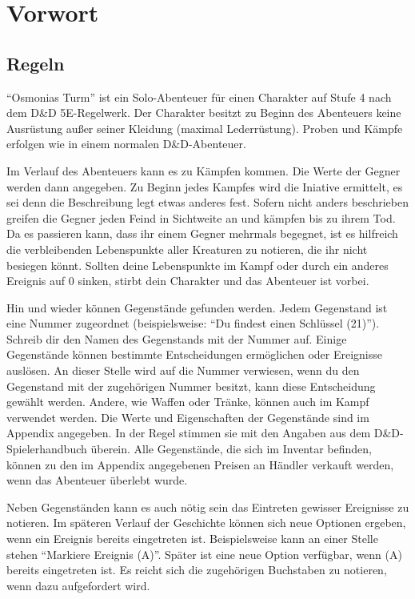 
\chapter*{Vorwort}

\section{Regeln}

``Osmonias Turm'' ist ein Solo-Abenteuer für einen Charakter auf Stufe 4 nach dem D\&D 5E-Regelwerk. Der Charakter besitzt zu Beginn des Abenteuers keine Ausrüstung außer seiner Kleidung (maximal Lederrüstung). Proben und Kämpfe erfolgen wie in einem normalen D\&D-Abenteuer.

Im Verlauf des Abenteuers kann es zu Kämpfen kommen. Die Werte der Gegner werden dann angegeben. Zu Beginn jedes Kampfes wird die Iniative ermittelt, es sei denn die Beschreibung legt etwas anderes fest. Sofern nicht anders beschrieben greifen die Gegner jeden Feind in Sichtweite an und kämpfen bis zu ihrem Tod. Da es passieren kann, dass ihr einem Gegner mehrmals begegnet, ist es hilfreich die verbleibenden Lebenspunkte aller Kreaturen zu notieren, die ihr nicht besiegen könnt. Sollten deine Lebenspunkte im Kampf oder durch ein anderes Ereignis auf 0 sinken, stirbt dein Charakter und das Abenteuer ist vorbei. 

Hin und wieder können Gegenstände gefunden werden. Jedem Gegenstand ist eine Nummer zugeordnet (beispielsweise: ``Du findest einen Schlüssel (21)''). Schreib dir den Namen des Gegenstands mit der Nummer auf. Einige Gegenstände können bestimmte Entscheidungen ermöglichen oder Ereignisse auslösen. An dieser Stelle wird auf die Nummer verwiesen, wenn du den Gegenstand mit der zugehörigen Nummer besitzt, kann diese Entscheidung gewählt werden. Andere, wie Waffen oder Tränke, können auch im Kampf verwendet werden. Die Werte und Eigenschaften der Gegenstände sind im Appendix angegeben. In der Regel stimmen sie mit den Angaben aus dem D\&D-Spielerhandbuch überein. Alle Gegenstände, die sich im Inventar befinden, können zu den im Appendix angegebenen Preisen an Händler verkauft werden, wenn das Abenteuer überlebt wurde.

Neben Gegenständen kann es auch nötig sein das Eintreten gewisser Ereignisse zu notieren. Im späteren Verlauf der Geschichte können sich neue Optionen ergeben, wenn ein Ereignis bereits eingetreten ist. Beispielsweise kann an einer Stelle stehen ``Markiere Ereignis (A)''. Später ist eine neue Option verfügbar, wenn (A) bereits eingetreten ist. Es reicht sich die zugehörigen Buchstaben zu notieren, wenn dazu aufgefordert wird.


